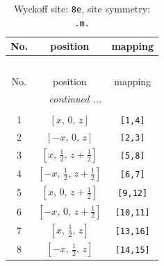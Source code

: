 \documentclass[fleqn,8pt]{jsarticle}
\begin{document}
\renewcommand{\arraystretch}{1.2}
\begin{longtable}{ccc}
\caption{Wyckoff site: {\tt 8e}, site symmetry: {\tt .m.}}
 \\
 \hline \hline
No. & position & mapping \\ \hline \endfirsthead

\multicolumn{2}{l}{\tablename\ \thetable{}} \\
 \hline \hline
No. & position & mapping \\ \hline \endhead

 \hline \hline
\multicolumn{2}{r}{\footnotesize\it continued ...} \\ \endfoot

 \hline \hline
\multicolumn{2}{r}{} \\ \endlastfoot

1 & $\left[ x,\, 0,\, z \right]$ & {\tt [1,4]} \\ \hline
2 & $\left[ - x,\, 0,\, z \right]$ & {\tt [2,3]} \\ \hline
3 & $\left[ x,\, \frac{1}{2},\, z + \frac{1}{2} \right]$ & {\tt [5,8]} \\ \hline
4 & $\left[ - x,\, \frac{1}{2},\, z + \frac{1}{2} \right]$ & {\tt [6,7]} \\ \hline
5 & $\left[ x,\, 0,\, z + \frac{1}{2} \right]$ & {\tt [9,12]} \\ \hline
6 & $\left[ - x,\, 0,\, z + \frac{1}{2} \right]$ & {\tt [10,11]} \\ \hline
7 & $\left[ x,\, \frac{1}{2},\, z \right]$ & {\tt [13,16]} \\ \hline
8 & $\left[ - x,\, \frac{1}{2},\, z \right]$ & {\tt [14,15]} \\
\end{longtable}
\renewcommand{\arraystretch}{1.2}
\end{document}
